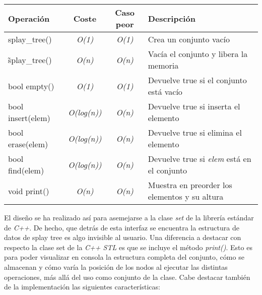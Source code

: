 \documentclass[letterpaper,12pt]{article}
\begin{document}
\begin{center}
\begin{tabular}{|l|c|c|l|}

	\hline
	\textbf{Operación} & \textbf{Coste} & \textbf{Caso peor} & \textbf{Descripción}\\
	\hline
    splay\_tree()    & \textit{O(1)}     & \textit{O(1)} & Crea un conjunto vacío\\
	\hline
    \~splay\_tree()  & \textit{O(n)}     & \textit{O(n)} & Vacía el conjunto y libera la memoria\\ 
	\hline
	bool empty()     & \textit{O(1)}     & \textit{O(1)} & Devuelve true si el conjunto está vacío\\
	\hline
	bool insert(elem)& \textit{O(log(n))}& \textit{O(n)} & Devuelve true si inserta el elemento\\
	\hline
	bool erase(elem) & \textit{O(log(n))}& \textit{O(n)} & Devuelve true si elimina el elemento\\
	\hline
	bool find(elem)  & \textit{O(log(n))}& \textit{O(n)} & Devuelve true si \textit{elem} está en el conjunto\\
	\hline
	void print()     & \textit{O(n)}     & \textit{O(n)} & Muestra en preorder los elementos y su altura\\
	\hline
	
\end{tabular}
\end{center}

El diseño se ha realizado así para asemejarse a la clase \textit{set} de la 
librería estándar de \textit{C++}. De hecho, que detrás de esta interfaz se 
encuentra la estructura de datos de splay tree es algo invisible al usuario. 
Una diferencia a destacar con respecto la clase set de la \textit{C++ STL} es 
que se incluye el método \textit{print()}. Esto es para poder visualizar en 
consola la estructura completa del conjunto, cómo se almacenan y cómo varía la
posición de los nodos al ejecutar las distintas operaciones, más allá del uso 
como conjunto de la clase. Cabe destacar también de la implementación las 
siguientes características:
\end{document}
